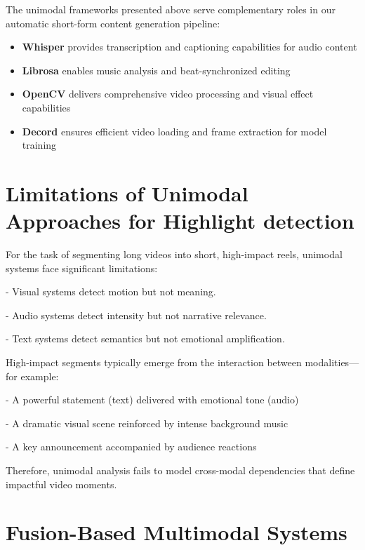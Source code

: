 \documentclass[12pt,a4paper,oneside,english]{book}
\begin{document}
The unimodal frameworks presented above serve complementary roles in our automatic short-form content generation pipeline:

\begin{itemize}
    \item \textbf{Whisper} provides transcription and captioning capabilities for audio content
    \item \textbf{Librosa} enables music analysis and beat-synchronized editing
    \item \textbf{OpenCV} delivers comprehensive video processing and visual effect capabilities
    \item \textbf{Decord} ensures efficient video loading and frame extraction for model training
\end{itemize}


\section{Limitations of Unimodal Approaches for Highlight detection}
\label{sec:unimodal_limitations}
For the task of segmenting long videos into short, high-impact reels, unimodal systems face significant limitations:

- Visual systems detect motion but not meaning.

- Audio systems detect intensity but not narrative relevance.

- Text systems detect semantics but not emotional amplification.

High-impact segments typically emerge from the interaction between modalities—for example:

- A powerful statement (text) delivered with emotional tone (audio)

- A dramatic visual scene reinforced by intense background music

- A key announcement accompanied by audience reactions

Therefore, unimodal analysis fails to model cross-modal dependencies that define impactful video moments.



\section{Fusion-Based Multimodal Systems}
\label{sec:fusion_based_systems}
\end{document}
